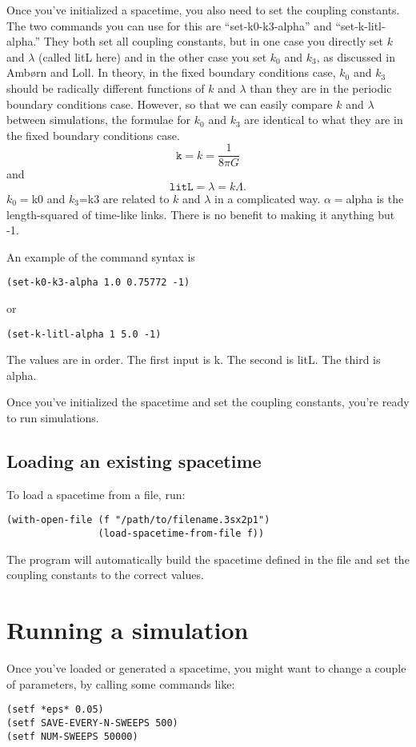 \documentclass{article}
\begin{document}
Once you've initialized a spacetime, you also need to set the coupling
constants. The two commands you can use for this are
``set-k0-k3-alpha'' and ``set-k-litl-alpha.'' They both set all
coupling constants, but in one case you directly set $k$ and $\lambda$
(called litL here) and in the other case you set $k_0$ and $k_3$, as
discussed in Amb\o rn and Loll. In theory, in the fixed boundary
conditions case, $k_0$ and $k_3$ should be radically different
functions of $k$ and $\lambda$ than they are in the periodic boundary
conditions case. However, so that we can easily compare $k$ and
$\lambda$ between simulations, the formulae for $k_0$ and $k_3$ are
identical to what they are in the fixed boundary conditions case.
$$\texttt{k} = k=\frac{1}{8\pi G}$$
and
$$\texttt{litL} = \lambda = k\Lambda.$$
$k_0=$k0 and $k_3$=k3 are related to $k$ and $\lambda$ in a
complicated way. $\alpha=$alpha is the length-squared of time-like
links. There is no benefit to making it anything but -1.

An example of the command syntax is 
\begin{lstlisting}
(set-k0-k3-alpha 1.0 0.75772 -1)
\end{lstlisting}
or
\begin{lstlisting}
(set-k-litl-alpha 1 5.0 -1)
\end{lstlisting}
The values are in order. The first input is k. The second is litL. The
third is alpha.

Once you've initialized the spacetime and set the coupling constants,
you're ready to run simulations.

\subsection{Loading an existing spacetime}
To load a spacetime from a file, run:
\begin{lstlisting}
(with-open-file (f "/path/to/filename.3sx2p1")
                (load-spacetime-from-file f))
\end{lstlisting}
The program will automatically build the spacetime defined in the file
and set the coupling constants to the correct values.

\section{Running a simulation}

Once you've loaded or generated a spacetime, you might want to change
a couple of parameters, by calling some commands like:
\begin{lstlisting}
(setf *eps* 0.05)
(setf SAVE-EVERY-N-SWEEPS 500)
(setf NUM-SWEEPS 50000)
\end{lstlisting}
\end{document}
